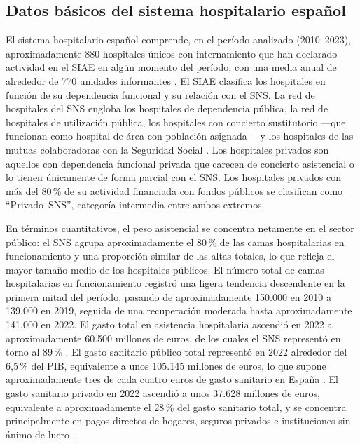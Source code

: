 \subsection{Datos básicos del sistema hospitalario español}
El sistema hospitalario español comprende, en el período analizado 
(2010--2023), aproximadamente 880 hospitales únicos con internamiento 
que han declarado actividad en el SIAE en algún momento del período, 
con una media anual de alrededor de 770 unidades informantes 
\citep{ministerio_siae2023}. El SIAE clasifica los hospitales en 
función de su dependencia funcional y su relación con el SNS. 
La red de hospitales del SNS engloba los hospitales de dependencia 
pública, la red de hospitales de utilización pública, los hospitales 
con concierto sustitutorio ---que funcionan como hospital de área 
con población asignada--- y los hospitales de las mutuas 
colaboradoras con la Seguridad Social \citep{ministerio_siae2023}. 
Los hospitales privados son aquellos con dependencia funcional 
privada que carecen de concierto asistencial o lo tienen únicamente 
de forma parcial con el SNS. Los hospitales privados con más del 
80\,\% de su actividad financiada con fondos públicos se clasifican 
como ``Privado~SNS'', categoría intermedia entre ambos extremos.

En términos cuantitativos, el peso asistencial se concentra 
netamente en el sector público: el SNS agrupa aproximadamente el 
80\,\% de las camas hospitalarias en funcionamiento y una proporción 
similar de las altas totales, lo que refleja el mayor tamaño medio 
de los hospitales públicos. El número 
total de camas hospitalarias en funcionamiento registró una ligera 
tendencia descendente en la primera mitad del período, pasando de 
aproximadamente 150.000 en 2010 a 139.000 en 2019, seguida de una 
recuperación moderada hasta aproximadamente 141.000 en 2022. El 
gasto total en asistencia hospitalaria ascendió en 2022 a 
aproximadamente 60.500 millones de euros, de los cuales el SNS 
representó en torno al 89\,\% \citep{ministerio_siae2023}. 
El gasto sanitario público total representó en 2022 alrededor del 
6,5\,\% del PIB, equivalente a unos 105.145 millones de euros, 
lo que supone aproximadamente tres de cada cuatro euros de 
gasto sanitario en España \citep{consalud2025}. 
El gasto sanitario privado en 2022 ascendió a unos 37.628 millones 
de euros, equivalente a aproximadamente el 28\,\% del gasto 
sanitario total, y se concentra principalmente en pagos directos 
de hogares, seguros privados e instituciones sin ánimo de lucro 
\citep{fbbva2025}. 

